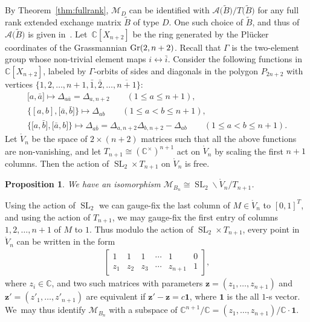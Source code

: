 \documentclass[pdftex]{sigma}%
\def\C{{\mathbb C}}
\def\A{{\mathcal{A}}}
\def\Gr{{\rm Gr}}
\def\oV{{\mathring{V}}}
\def\tB{{\tilde B}}
\def\M{{\mathcal{M}}}
\def\tB{{\tilde B}}
\def\z{{\mathbf z}}
\def\one{{\mathbf 1}}
\def\SL{\operatorname{SL}}
\numberwithin{equation}{section}
\newtheorem{Proposition}[Theorem]{Proposition}
\begin{document}
\bigskip{}
By Theorem~\ref{thm:fullrank}, $\M_D$ can be identified with $\A\big(\tB\big)/T\big(\tB\big)$ for any full rank extended exchange matrix $\tB$ of type $D$. One such choice of $\tB$, and thus of $\A\big(\tB\big)$ is given in~\cite[Example 12.10]{CA2}. Let~$\C[X_{n+2}]$ be the ring generated by the Pl\"ucker coordinates of the Grassmannian $\Gr(2,n+2)$. Recall that $\Gamma$ is the two-element group whose non-trivial element maps $i \leftrightarrow \bar i$. Consider the following functions in $\C[X_{n+2}]$, labeled by $\Gamma$-orbits of sides and diagonals in the polygon $P_{2n+2}$ with vertices $\big\{1,2,\dots,n+1,\bar 1, \bar 2, \dots, \overline{n+1}\big\}$:
\begin{gather*}
\big[a, \bar a\big] \mapsto \Delta_{a \bar a} = \Delta_{a,n+2} \qquad (1 \leq a \leq n+1),
\\[.5ex]
\big\{[a,b],\big[\bar a, \bar b\big]\big\} \mapsto \Delta_{ab} \qquad (1 \leq a < b \leq n+1),
\\[.5ex]
\big\{\big[a,\bar b\big],\big[\bar a, b\big]\big\} \mapsto \Delta_{a \bar b} = \Delta_{a,n+2} \Delta_{b,n+2} - \Delta_{ab}\qquad
(1 \leq a < b \leq n+1).
\end{gather*}
Let $\oV_n$ be the space of $2 \times (n+2)$ matrices such that all the above functions are non-vanishing, and let $T_{n+1} \cong (\C^\times)^{n+1}$ act on $\oV_n$ by scaling the first $n+1$ columns. Then the action of $\SL_2 \times T_{n+1}$ on $\oV_n$ is free.
\begin{Proposition}
We have an isomorphism $\M_{B_n} \cong \SL_2 \backslash \oV_n/T_{n+1}$.
\end{Proposition}
Using the action of $\SL_2$ we can gauge-fix the last column of $M \in \oV_n$ to $[0,1]^T$, and using the action of $T_{n+1}$, we may gauge-fix the first entry of columns $1,2,\dots,n+1$ of $M$ to $1$.
Thus modulo the action of $\SL_2 \times T_{n+1}$, every point in $\oV_n$ can be written in the form\vspace{-.5ex}
\begin{gather*}
\begin{bmatrix}
1 & 1 & 1 & \cdots &1 & 0 \\
z_1 & z_2 & z_3 & \cdots & z_{n+1} & 1
\end{bmatrix}\!,
\end{gather*}
where $z_i \in \C$, and two such matrices with parameters $\z = (z_1,\dots,z_{n+1})$ and $\z'=(z'_1,\dots,z'_{n+1})$ are equivalent if $\z' -\z = c \one$, where $\one$ is the all $1$-s vector. We~may thus identify $\M_{B_n}$ with a subspace of $\C^{n+1}/\C= (z_1,\dots,z_{n+1})/\C\cdot \one$.
\end{document}
